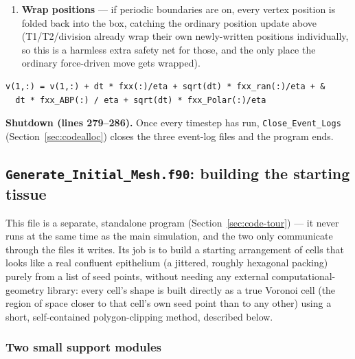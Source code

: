 \documentclass[11pt]{article}
\begin{document}
\begin{enumerate}[nosep, leftmargin=1.7em]
  \texttt{Apply\_perturbation}, \texttt{ShearTissue} (paired with
  \texttt{Calculate\_StressTensor}, Section~\ref{sec:codestress}),
  \texttt{Apply\_Limb\_Force}, \texttt{Do\_Proliferation} (Section~\ref{sec:codeprolif}),
  \texttt{Squeeze\_Tissue} (only exactly at the requested timestep).
  \item \textbf{Wrap positions} --- if periodic boundaries are on, every vertex position
  is folded back into the box, catching the ordinary position update above (T1/T2/division
  already wrap their own newly-written positions individually, so this is a harmless
  extra safety net for those, and the only place the ordinary force-driven move gets
  wrapped).
\end{enumerate}

\begin{lstlisting}[caption={The overdamped position update applied directly in \texttt{vertexmain}'s main loop --- every force computed above, summed and turned into a displacement.}]
v(1,:) = v(1,:) + dt * fxx(:)/eta + sqrt(dt) * fxx_ran(:)/eta + &
  dt * fxx_ABP(:) / eta + sqrt(dt) * fxx_Polar(:)/eta
\end{lstlisting}

\textbf{Shutdown (lines 279--286).} Once every timestep has run, \texttt{Close\_Event\_Logs}
(Section~\ref{sec:codealloc}) closes the three event-log files and the program ends.
\subsection{\texttt{Generate\_Initial\_Mesh.f90}: building the starting tissue}
\label{sec:codegenmesh}

This file is a separate, standalone program (Section~\ref{sec:code-tour}) --- it never
runs at the same time as the main simulation, and the two only communicate through the
files it writes. Its job is to build a starting arrangement of cells that looks like a
real confluent epithelium (a jittered, roughly hexagonal packing) purely from a list of
seed points, without needing any external computational-geometry library: every cell's
shape is built directly as a true Voronoi cell (the region of space closer to that
cell's own seed point than to any other) using a short, self-contained
polygon-clipping method, described below.

\subsubsection*{Two small support modules}
\end{document}
